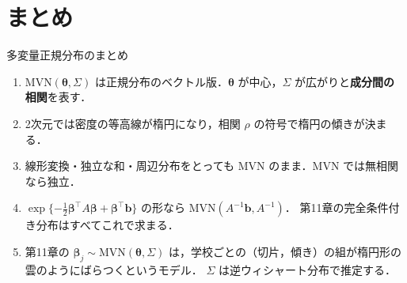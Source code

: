 \documentclass[lualatex,ja=standard,a4paper,12pt]{bxjsarticle}
\newcommand{\mvn}{\mathrm{MVN}}
\begin{document}
\section{まとめ}

\begin{thmbox}{多変量正規分布のまとめ}
\begin{enumerate}
  \item $\mvn(\bm{\theta}, \Sigma)$ は正規分布のベクトル版．$\bm{\theta}$ が中心，$\Sigma$ が広がりと\textbf{成分間の相関}を表す．
  \item 2次元では密度の等高線が楕円になり，相関 $\rho$ の符号で楕円の傾きが決まる．
  \item 線形変換・独立な和・周辺分布をとっても MVN のまま．MVN では無相関なら独立．
  \item $\exp\{-\frac12\bm{\beta}^\top A\bm{\beta} + \bm{\beta}^\top\bm{b}\}$ の形なら $\mvn(A^{-1}\bm{b}, A^{-1})$．
        第11章の完全条件付き分布はすべてこれで求まる．
  \item 第11章の $\bm{\beta}_j \sim \mvn(\bm{\theta}, \Sigma)$ は，学校ごとの（切片，傾き）の組が楕円形の雲のようにばらつくというモデル．
        $\Sigma$ は逆ウィシャート分布で推定する．
\end{enumerate}
\end{thmbox}
\end{document}
